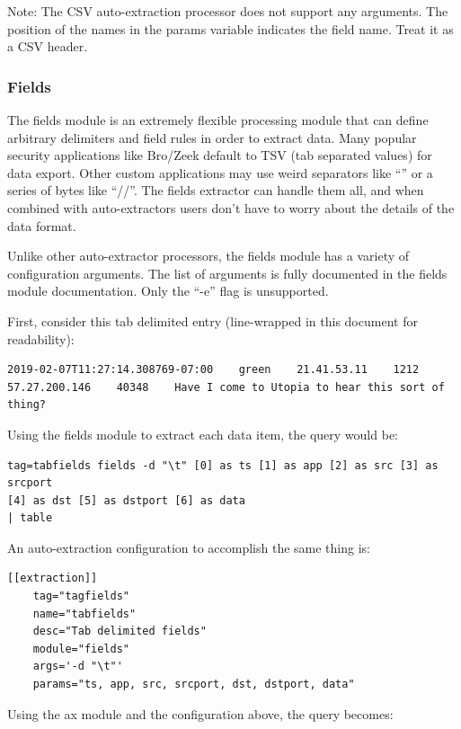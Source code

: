 Note: The CSV auto-extraction processor does not support any
arguments. The position of the names in the params variable indicates
the field name. Treat it as a CSV header.

\subsubsection{Fields}

The fields module is an extremely flexible processing module that can
define arbitrary delimiters and field rules in order to extract data.
Many popular security applications like Bro/Zeek default to TSV (tab
separated values) for data export. Other custom applications may use
weird separators like ``\textbar{}'' or a series of bytes like ``//''. The
fields extractor can handle them all, and when combined with
auto-extractors users don't have to worry about the details of the data
format.

Unlike other auto-extractor processors, the fields module has a variety
of configuration arguments. The list of arguments is fully documented in
the fields module documentation. Only the ``-e'' flag is unsupported.

First, consider this tab delimited entry (line-wrapped in this document for readability):

\begin{Verbatim}[breaklines=true]
2019-02-07T11:27:14.308769-07:00    green    21.41.53.11    1212    
57.27.200.146    40348    Have I come to Utopia to hear this sort of thing?
\end{Verbatim}

Using the fields module to extract each data item, the query would be:

\begin{Verbatim}[breaklines=true]
tag=tabfields fields -d "\t" [0] as ts [1] as app [2] as src [3] as srcport
[4] as dst [5] as dstport [6] as data
| table
\end{Verbatim}

An auto-extraction configuration to accomplish the same thing is:

\begin{Verbatim}[breaklines=true]
[[extraction]]
    tag="tagfields"
    name="tabfields"
    desc="Tab delimited fields"
    module="fields"
    args='-d "\t"'
    params="ts, app, src, srcport, dst, dstport, data"
\end{Verbatim}

Using the ax module and the configuration above, the query becomes:

